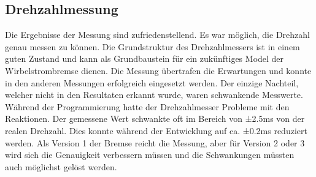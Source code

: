 \subsection{Drehzahlmessung}\label{cap:diskussion_drehzahlmessung}
Die Ergebnisse der Messung sind zufriedenstellend. Es war möglich, die Drehzahl genau messen zu können. Die Grundstruktur des Drehzahlmessers ist in einem guten Zustand und kann als Grundbaustein für ein zukünftiges Model der Wirbelstrombremse dienen. Die Messung übertrafen die Erwartungen und konnte in den anderen Messungen erfolgreich eingesetzt werden.
\newpara
Der einzige Nachteil, welcher nicht in den Resultaten erkannt wurde, waren schwankende Messwerte. Während der Programmierung hatte der Drehzahlmesser Probleme mit den Reaktionen. Der gemessene Wert schwankte oft im Bereich von ±2.5ms von der realen Drehzahl. Dies konnte während der Entwicklung auf ca. ±0.2ms reduziert werden.
\newpara
Als Version 1 der Bremse reicht die Messung, aber für Version 2 oder 3 wird sich die Genauigkeit verbessern müssen und die Schwankungen müssten auch möglichst gelöst werden. 